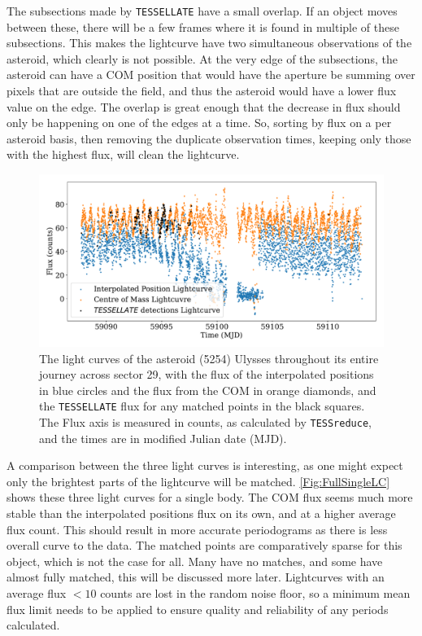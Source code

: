 \documentclass{UCreport}
\begin{document}
The subsections made by \texttt{TESSELLATE} have a small overlap.
If an object moves between these, there will be a few frames where it is found in multiple of these subsections.
This makes the lightcurve have two simultaneous observations of the asteroid, which clearly is not possible.
At the very edge of the subsections, the asteroid can have a COM position that would have the aperture be summing over pixels that are outside the field, and thus the asteroid would have a lower flux value on the edge.
The overlap is great enough that the decrease in flux should only be happening on one of the edges at a time.
So, sorting by flux on a per asteroid basis, then removing the duplicate observation times, keeping only those with the highest flux, will clean the lightcurve.


\begin{figure}
  \centering
  \includegraphics[width =\textwidth]{../OzData/SingleBodyLCUlyssesCorrectedAgain.pdf}
  \caption[Light curves Example]{The light curves of the asteroid (5254) Ulysses throughout its entire journey across sector 29, with the flux of the interpolated positions in blue circles and the flux from the COM in orange diamonds, and the \texttt{TESSELLATE} flux for any matched points in the black squares.
    The Flux axis is measured in counts, as calculated by \texttt{TESSreduce}, and the times are in modified Julian date (MJD).}
  \label{Fig:FullSingleLC}
\end{figure}
A comparison between the three light curves is interesting, as one might expect only the brightest parts of the lightcurve will be matched.
\autoref{Fig:FullSingleLC} shows these three light curves for a single body.
The COM flux seems much more stable than the interpolated positions flux on its own, and at a higher average flux count.
This should result in more accurate periodograms as there is less overall curve to the data.
The matched points are comparatively sparse for this object, which is not the case for all.
Many have no matches, and some have almost fully matched, this will be discussed more later.
Lightcurves with an average flux $<10$ counts are lost in the random noise floor, so a minimum mean flux limit needs to be applied to ensure quality and reliability of any periods calculated.
\end{document}
